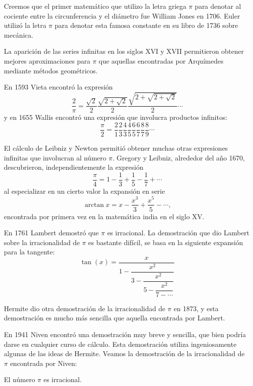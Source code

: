 Creemos que el primer matemático que utilizo la letra griega $\pi$ para denotar
al cociente entre la circunferencia y el diámetro fue William Jones en 1706.
Euler utilizó la letra $\pi$ para denotar esta famosa constante en su libro de
1736 sobre mecánica. 

La aparición de las series infinitas en los siglos XVI y XVII permitieron
obtener mejores aproximaciones para $\pi$ que aquellas encontradas por
Arquímedes mediante métodos geométricos. 

\label{Vieta}
\label{Wallis}
En 1593 Vieta encontró la
expresión
\[
	\frac{2}{\pi}=\dfrac{\sqrt{2}}{2}\dfrac{\sqrt{2+\sqrt{2}}}{2}\dfrac{\sqrt{2+\sqrt{2+\sqrt{2}}}}{2}\cdots
\]
y en 1655 Wallis encontró una expresión que involucra productos infinitos:
\[
	\frac{\pi}{2}=\frac21\frac23\frac43\frac45\frac65\frac67\frac87\frac89\cdots
\]

\label{LeibnizGregory}
El cálculo de Leibniz y Newton permitió obtener muchas otras expresiones
infinitas que involucran al número $\pi$. Gregory y Leibniz, alrededor del año
1670, descubrieron, independientemente la expresión
\[
	\frac{\pi}{4}=1-\frac13+\frac15-\frac17+\cdots
\]
al especializar en un cierto valor la expansión en serie 
\[
	\arctan x=x-\frac{x^3}{3}+\frac{x^5}{5}-\cdots,
\]
encontrada por primera vez en la matemática india en el siglo XV.

En 1761 Lambert demostró que $\pi$ es irracional.  La demostración que dio
Lambert sobre la irracionalidad de $\pi$ es bastante difícil, se basa en la
siguiente expansión para la tangente:
\[
	\tan(x)=\dfrac{x}{1-\dfrac{x^2}{3-\dfrac{x^2}{5-\dfrac{x^2}{7-\cdots}}}}
\]

Hermite dio otra demostración de la irracionalidad de $\pi$ en 1873, y esta
demostración es mucho más sencilla que aquella encontrada por Lambert. 

En 1941 Niven encontró una demostración muy breve y sencilla, que bien podría
darse en cualquier curso de cálculo. Esta demostración utiliza ingeniosamente
algunas de las ideas de Hermite. Veamos la demostración de la irracionalidad de
$\pi$ encontrada por Niven:

\begin{theorem}
	El número $\pi$ es irracional.	
\end{theorem}

